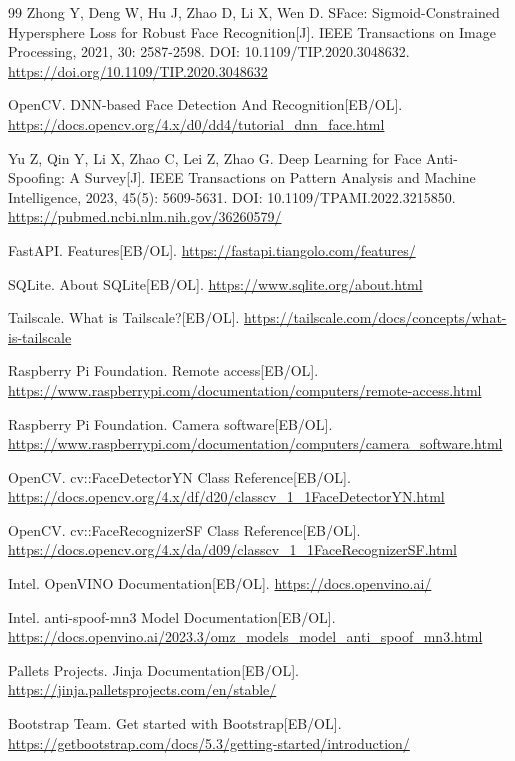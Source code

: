\documentclass{heuthesis}
\begin{document}
\begin{thebibliography}{99}
Zhong Y, Deng W, Hu J, Zhao D, Li X, Wen D. SFace: Sigmoid-Constrained Hypersphere Loss for Robust Face Recognition[J]. IEEE Transactions on Image Processing, 2021, 30: 2587-2598. DOI: 10.1109/TIP.2020.3048632. \url{https://doi.org/10.1109/TIP.2020.3048632}

OpenCV. DNN-based Face Detection And Recognition[EB/OL]. \url{https://docs.opencv.org/4.x/d0/dd4/tutorial_dnn_face.html}

Yu Z, Qin Y, Li X, Zhao C, Lei Z, Zhao G. Deep Learning for Face Anti-Spoofing: A Survey[J]. IEEE Transactions on Pattern Analysis and Machine Intelligence, 2023, 45(5): 5609-5631. DOI: 10.1109/TPAMI.2022.3215850. \url{https://pubmed.ncbi.nlm.nih.gov/36260579/}

FastAPI. Features[EB/OL]. \url{https://fastapi.tiangolo.com/features/}

SQLite. About SQLite[EB/OL]. \url{https://www.sqlite.org/about.html}

Tailscale. What is Tailscale?[EB/OL]. \url{https://tailscale.com/docs/concepts/what-is-tailscale}

Raspberry Pi Foundation. Remote access[EB/OL]. \url{https://www.raspberrypi.com/documentation/computers/remote-access.html}

Raspberry Pi Foundation. Camera software[EB/OL]. \url{https://www.raspberrypi.com/documentation/computers/camera_software.html}

OpenCV. cv::FaceDetectorYN Class Reference[EB/OL]. \url{https://docs.opencv.org/4.x/df/d20/classcv_1_1FaceDetectorYN.html}

OpenCV. cv::FaceRecognizerSF Class Reference[EB/OL]. \url{https://docs.opencv.org/4.x/da/d09/classcv_1_1FaceRecognizerSF.html}

Intel. OpenVINO Documentation[EB/OL]. \url{https://docs.openvino.ai/}

Intel. anti-spoof-mn3 Model Documentation[EB/OL]. \url{https://docs.openvino.ai/2023.3/omz_models_model_anti_spoof_mn3.html}

Pallets Projects. Jinja Documentation[EB/OL]. \url{https://jinja.palletsprojects.com/en/stable/}

Bootstrap Team. Get started with Bootstrap[EB/OL]. \url{https://getbootstrap.com/docs/5.3/getting-started/introduction/}

\end{thebibliography}
\end{document}
